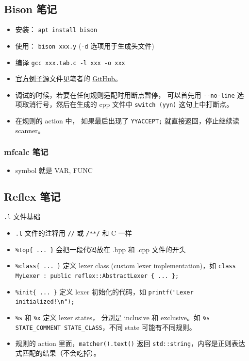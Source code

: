 \subsection{Bison 笔记}
\begin{itemize}
\item 安装： \verb`apt install bison`
\item 使用： \verb`bison xxx.y` (\verb`-d` 选项用于生成头文件)
\item 编译 \verb`gcc xxx.tab.c -l xxx -o xxx`
\item \href{http://web.mit.edu/gnu/doc/html/bison_5.html}{官方例子}源文件见笔者的 \href{https://github.com/MacroUniverse/bison_test}{GitHub}。
\item 调试的时候，若要在任何规则适配时用断点暂停， 可以首先用 \verb`--no-line` 选项取消行号，然后在生成的 cpp 文件中 \verb`switch (yyn)` 这句上中打断点。
\item 在规则的 action 中， 如果最后出现了 \verb`YYACCEPT;` 就直接返回，停止继续读 scanner。
\end{itemize}

\subsubsection{mfcalc 笔记}
\begin{itemize}
\item symbol 就是 VAR, FUNC
\end{itemize}

\subsection{Reflex 笔记}
\verb`.l` 文件基础
\begin{itemize}
\item \verb`.l` 文件的注释用 \verb`//` 或 \verb`/**/` 和 C 一样
\item \verb`%top{ ... }` 会把一段代码放在 .hpp 和 .cpp 文件的开头
\item \verb`%class{ ... }` 定义 lexer class (custom lexer implementation)，如 \verb`class MyLexer : public reflex::AbstractLexer { ... };`
\item \verb`%init{ ... }` 定义 lexer 初始化的代码，如 \verb`printf("Lexer initialized!\n");`
\item \verb`%s` 和 \verb`%x` 定义 lexer states， 分别是 inclusive 和 exclusive。如 \verb`%s STATE_COMMENT STATE_CLASS`，不同 state 可能有不同规则。
\item 规则的 action 里面，\verb`matcher().text()` 返回 \verb`std::string`，内容是正则表达式匹配的结果（不会吃掉）。
\end{itemize}
